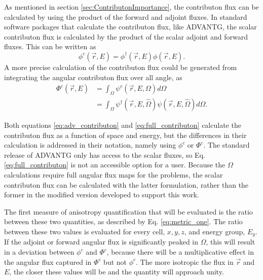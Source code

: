 As mentioned in section \ref{sec:ContributonImportance}, the
contributon flux can be calculated by using
the product of the forward and adjoint fluxes. In standard software packages
that calculate the contributon flux, like ADVANTG, the scalar contributon flux is calculated by the product
of the scalar adjoint and forward fluxes. This can be written as
%
\begin{equation}
  \phi^{c}(\vec {r} ,E)  = \phi^{\dagger}(\vec {r} ,E)\phi(\vec {r} ,E) .
\label{eq:adv_contributon}
\end{equation}
%
A more precise calculation of the contributon flux could be generated from
integrating the angular contributon flux over all angle, as
%
\begin{equation}
  \begin{split}
    \Phi^{c}(\vec {r} ,E)  & = \int_{\Omega}{\psi^{c}(\vec{r}, E,\Omega)}
                               d\Omega \\
             & = \int_{\Omega}{\psi^{\dagger}(\vec{r}, E, \hat\Omega)
                 \psi(\vec{r}, E, \hat\Omega)} d\Omega .
  \end{split}
\label{eq:full_contributon}
\end{equation}

Both equations \ref{eq:adv_contributon} and \ref{eq:full_contributon} calculate
the contributon flux as a function of space and energy, but the
differences in their calculation is addressed in their notation, namely using
$\phi^{c}$ or $\Phi^{c}$. The standard release of ADVANTG only has
access to the scalar
fluxes, so Eq. \ref{eq:full_contributon} is not an accessible option for a
user. Because the $\Omega$ calculations require full angular flux maps for the
problems, the scalar contributon flux can be calculated with the latter
formulation, rather than the former in the modified version developed to support
this work.

The first measure of anisotropy quantification that will be evaluated is the
ratio between these two quantities, as described by Eq. \ref{eq:metric_one}.
The ratio between these two values is evaluated for every cell, $x,y,z$, and energy
group, $E_g$.
If the adjoint or forward angular flux is significantly
peaked in $\Omega$, this will result in a deviation between $\phi^{c}$ and
$\Phi^{c}$, because there will be a multiplicative effect in the angular flux
captured in $\Phi^{c}$ but not $\phi^{c}$. The more isotropic the
flux in $\vec{r}$ and $E$, the closer these
values will be and the quantity will approach unity.

